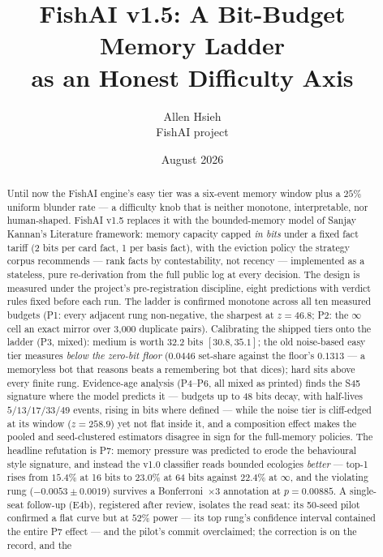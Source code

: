 \documentclass[11pt]{article}
\title{FishAI v1.5: A Bit-Budget Memory Ladder\\ as an Honest Difficulty Axis}
\author{Allen Hsieh\\[2pt] {\small FishAI project}}
\date{August 2026}
\begin{document}
\maketitle

\begin{abstract}
\noindent
Until now the FishAI engine's easy tier was a six-event memory window plus a $25\%$
uniform blunder rate --- a difficulty knob that is neither monotone, interpretable, nor
human-shaped. FishAI v1.5 replaces it with the bounded-memory model of Sanjay Kannan's
Literature framework: memory capacity capped \emph{in bits} under a fixed fact tariff (2
bits per card fact, 1 per basis fact), with the eviction policy the strategy corpus
recommends --- rank facts by contestability, not recency --- implemented as a stateless,
pure re-derivation from the full public log at every decision. The design is measured
under the project's pre-registration discipline, eight predictions with verdict rules
fixed before each run. The ladder is confirmed monotone across all ten measured budgets
(P1: every adjacent rung non-negative, the sharpest at $z = 46.8$; P2: the $\infty$ cell
an exact mirror over 3{,}000 duplicate pairs). Calibrating the shipped tiers onto the
ladder (P3, mixed): medium is worth $32.2$ bits $[30.8, 35.1]$; the old noise-based easy
tier measures \emph{below the zero-bit floor} ($0.0446$ set-share against the floor's
$0.1313$ --- a memoryless bot that reasons beats a remembering bot that dices); hard
sits above every finite rung. Evidence-age analysis (P4--P6, all mixed as printed)
finds the S45 signature where the model predicts it --- budgets up to $48$ bits decay,
with half-lives $5/13/17/33/49$ events, rising in bits where defined --- while the
noise tier is cliff-edged at its window ($z = 258.9$) yet not flat inside it, and a composition
effect makes the pooled and seed-clustered estimators disagree in sign for the
full-memory policies. The headline refutation is P7: memory pressure was predicted to
erode the behavioural style signature, and instead the v1.0 classifier reads bounded
ecologies \emph{better} --- top-1 rises from $15.4\%$ at 16 bits to $23.0\%$ at 64 bits
against $22.4\%$ at $\infty$, and the violating rung ($-0.0053 \pm 0.0019$) survives a
Bonferroni~$\times 3$ annotation at $p = 0.00885$. A single-seat follow-up (E4b),
registered after review, isolates the read seat: its 50-seed pilot confirmed a flat
curve but at $52\%$ power --- its top rung's confidence interval contained the entire P7
effect --- and the pilot's commit overclaimed; the correction is on the record, and the

\end{abstract}
\end{document}
